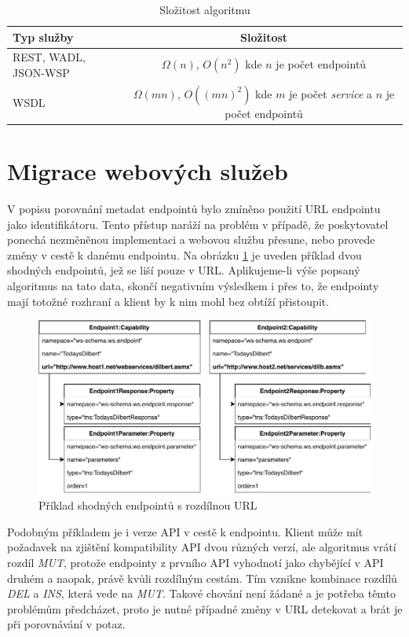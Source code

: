 \documentclass[czech,DP]{thesiskiv}
\begin{document}
\begin{table}[h]
	\centering
	\begin{tabular}{|l|c|}
		\hline
		Typ služby & Složitost \\
		\hline
		\hline
		REST, WADL, JSON-WSP & $\Omega(n)$, $O(n^2)$ kde $n$ je počet endpointů \\
		\hline
		WSDL & \makecell{$\Omega(mn)$, $O((mn)^2)$ kde $m$ je počet \textit{service}\\ a $n$ je počet endpointů} \\
		\hline
	\end{tabular}
	\caption{Složitost algoritmu}
	\label{tab:alg-complexity}
\end{table}
	
\section{Migrace webových služeb}	
\label{subsec:mov}
V popisu porovnání metadat endpointů bylo zmíněno použití URL endpointu jako identifikátoru. Tento přístup naráží na problém v případě, že poskytovatel ponechá nezměněnou implementaci a webovou službu přesune, nebo provede změny v cestě k danému endpointu. Na obrázku \ref{fig:mov-example} je uveden příklad dvou shodných endpointů, jež se liší pouze v URL. Aplikujeme-li výše popsaný algoritmus na tato data, skončí negativním výsledkem i přes to, že endpointy mají totožné rozhraní a klient by k nim mohl bez obtíží přistoupit. 

\begin{figure}[h]
	\centering
	\includegraphics[width=\linewidth]{same-end-diff-url}
	\caption{Příklad shodných endpointů s rozdílnou URL}
	\label{fig:mov-example}
\end{figure}

Podobným příkladem je i verze API v cestě k endpointu. Klient může mít požadavek na zjištění kompatibility API dvou různých verzí, ale algoritmus vrátí rozdíl \textit{MUT}, protože endpointy z prvního API vyhodnotí jako chybějící v API druhém a naopak, právě kvůli rozdílným cestám. Tím vznikne kombinace rozdílů \textit{DEL} a \textit{INS}, která vede na \textit{MUT}. Takové chování není žádané a je potřeba těmto problémům předcházet, proto je nutné případné změny v URL detekovat a brát je při porovnávání v potaz.
\end{document}

